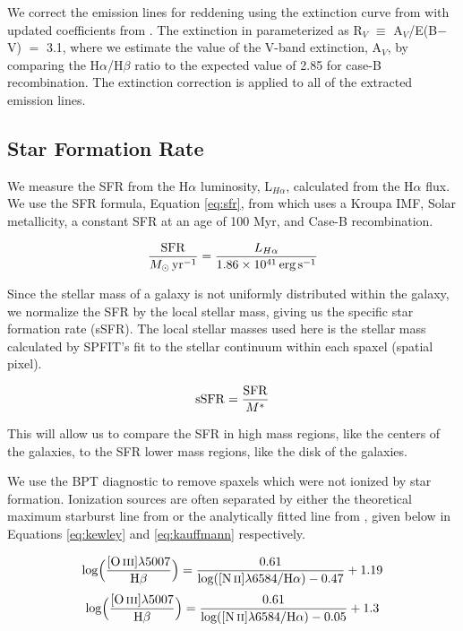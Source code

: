\documentclass[iop,revtex4,twocolumn,apj,numberedappendix,appendixfloats]{emulateapj}
\begin{document}
We correct the emission lines for reddening using the extinction curve from \citet{Cardelli:1989} with updated coefficients from \citet{ODonnell:1994}. The extinction in parameterized as R$_V$ $\equiv$ A$_V$/E(B$-$V) $=$ 3.1, where we estimate the value of the V-band extinction, A$_V$, by comparing the H$\alpha$/H$\beta$ ratio to the expected value of 2.85 for case-B recombination. The extinction correction is applied to all of the extracted emission lines.

\subsection{Star Formation Rate}

We measure the SFR from the H$\alpha$ luminosity, L$_{H\alpha}$, calculated from the H$\alpha$ flux.  We use the SFR formula, Equation \ref{eq:sfr}, from \citet{Murphy:2011} which uses a Kroupa IMF, Solar metallicity, a constant SFR at an age of 100 Myr, and Case-B recombination. 

\begin{equation}\label{eq:sfr}
\frac{\rm{SFR}}{M_{\odot} \, \rm{yr^{-1}}} = \frac{L_{H\alpha}}{1.86 \times 10^{41}\, \rm{erg\,s}^{-1}}
\end{equation}

Since the stellar mass of a galaxy is not uniformly distributed within the galaxy, we normalize the SFR by the local stellar mass, giving us the specific star formation rate (sSFR). The local stellar masses used here is the stellar mass calculated by {\sc SPFIT}'s fit to the stellar continuum within each spaxel (spatial pixel).

\begin{equation}
{\rm sSFR} = \frac{\rm SFR}{M^*}
\end{equation}

This will allow us to compare the SFR in high mass regions, like the centers of the galaxies, to the SFR lower mass regions, like the disk of the galaxies.


We use the BPT diagnostic \citep{Baldwin:1981} to remove spaxels which were not ionized by star formation. Ionization sources are often separated by either the theoretical maximum starburst line from \citet{Kewley:2001} or the analytically fitted line from \citet{Kauffmann:2003}, given below in Equations \ref{eq:kewley} and \ref{eq:kauffmann} respectively.

\begin{equation}\label{eq:kewley}
\rm{log\Big(\frac{[O\,\textsc{iii}]\lambda 5007}{H\beta}\Big) = \frac{0.61}{log([N\,\textsc{ii}]\lambda 6584 / H\alpha) - 0.47} + 1.19}
\end{equation}
\begin{equation}\label{eq:kauffmann}
\rm{log\Big(\frac{[O\,\textsc{iii}]\lambda 5007}{H\beta}\Big) = \frac{0.61}{log([N\,\textsc{ii}]\lambda 6584 / H\alpha) - 0.05} + 1.3}
\end{equation}
\end{document}
